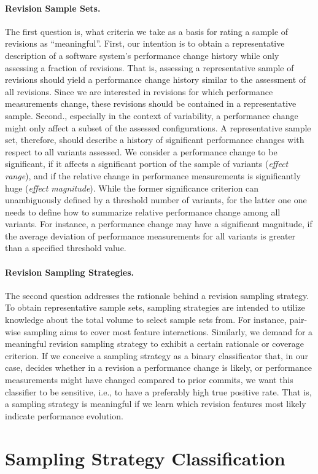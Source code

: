 \paragraph{Revision Sample Sets.} The first question is, what criteria we take
as a basis for rating a sample of revisions as “meaningful”. First, our
intention is to obtain a representative description of a software system’s
performance change history while only assessing a fraction of revisions. That
is, assessing a representative sample of revisions should yield a performance
change history similar to the assessment of all revisions. Since we are
interested in revisions for which performance measurements change, these
revisions should be contained in a representative sample. Second., especially
in the context of variability, a performance change might only affect a subset
of the assessed configurations. A representative sample set, therefore, should
describe a history of significant performance changes with respect to all
variants assessed. We consider a performance change to be significant, if it
affects a significant portion of the sample of variants (\emph{effect range}),
and if the relative change in performance measurements is significantly huge
(\emph{effect magnitude}). While the former significance criterion can
unambiguously defined by a threshold number of variants, for the latter one one needs to define how
to summarize relative performance change among all variants. For instance, a
performance change may have a significant magnitude, if the average deviation
of performance measurements for all variants is greater than a specified
threshold value.

\paragraph{Revision Sampling Strategies.} The second question addresses the
rationale behind a revision sampling strategy. To obtain representative sample
sets, sampling strategies are intended to utilize knowledge about the total
volume to select sample sets from. For instance, pair-wise sampling aims to
cover most feature interactions. Similarly, we demand for a meaningful revision
sampling strategy to exhibit a certain rationale or coverage criterion. If we
conceive a sampling strategy as a binary classificator that, in our case,
decides whether in a revision a performance change is likely, or performance
measurements might have changed compared to prior commits, we want  this
classifier to be sensitive, i.e., to have a preferably high true positive rate.
That is, a sampling strategy is meaningful if we learn which revision features
most likely indicate performance evolution.



\section{Sampling Strategy Classification}

